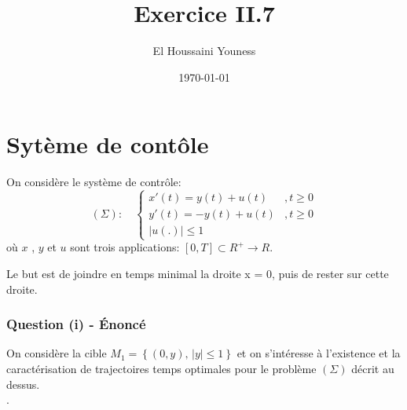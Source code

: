 \documentclass[xcolor=dvipsnames]{beamer}
\title{Exercice II.7}
\author{El Houssaini Youness}
\date{\today}
\begin{document}
\maketitle

\section{Sytème de contôle} 
\begin {frame}
On considère le système de contrôle: $$(\Sigma): \quad \left\lbrace\begin{array}{ll}
x'(t) = y(t)+u(t) & ,t\geq 0\\
y'(t) = -y(t)+u(t) & ,t\geq 0\\
|u(.)| \leq 1 
\end{array}\right.$$
où $x$ , $y$ et $u$ sont trois applications: $[0,T] \subset R^{+} \rightarrow R $.

Le but est de joindre en temps minimal la droite x = 0, puis de rester sur cette droite. \\

\end {frame}

\begin{frame}
\frametitle{Question (i) -  Énoncé}
On considère la cible $M_1 = \left\lbrace(0,y),\,|y| ≤ 1\right\rbrace$ et on s’intéresse à l’existence et la caractérisation de trajectoires temps optimales pour le problème $(\Sigma)$ décrit au dessus. \\
\vspace{1cm}
{\color{blue}{Montrer que si un tel contrôle existe, alors on a nécessairement |y(t)| ≤ 1 lorsque
x(t) = 0. Réciproquement, montrer que de tout point (0,y) ∈ $M_1$, part une trajectoire restant dans $M_1$}.}
\end{frame}
\end{document}
